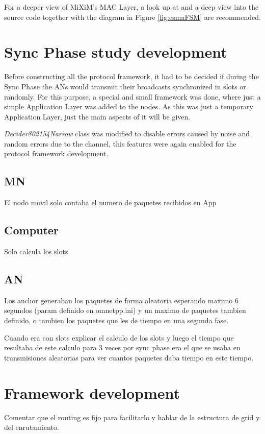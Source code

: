 For a deeper view of \ac{MiXiM}'s \ac{MAC} Layer, a look up at \cite{MiXiM} and a deep view into the source code together with the diagram in Figure 
\ref{fig:csmaFSM} are recommended.


\section{Sync Phase study development}

Before constructing all the protocol framework, it had to be decided if during the Sync Phase the \acp{AN} would transmit their broadcasts 
synchronized in slots or randomly. For this purpose, a special and small framework was done, where just a simple Application Layer was added to 
the nodes. As this was just a temporary Application Layer, just the main aspects of it will be given.

\textit{Decider802154Narrow} class was modified to disable errors caused by noise and random errors due to the channel, this features were 
again enabled for the protocol framework development.

\subsection{\ac{MN}}

El nodo movil solo contaba el numero de paquetes recibidos en App

\subsection{Computer}

Solo calcula los slots

\subsection{\ac{AN}}

Los anchor generaban los paquetes de forma aleatoria esperando maximo 6 segundos (param definido en omnetpp.ini) y un maximo de paquetes tambien 
definido, o tambien los paquetes que les de tiempo en una segunda fase.

Cuando era con slots explicar el calculo de los slots y luego el tiempo que resultaba de este calculo para 3 veces por sync phase era el que se 
usaba en transmisiones aleatorias para ver cuantos paquetes daba tiempo en este tiempo.


\section{Framework development}
\label{sec:frameworkdevelopment}



Comentar que el routing es fijo para facilitarlo y hablar de la estructura de grid y del enrutamiento.
